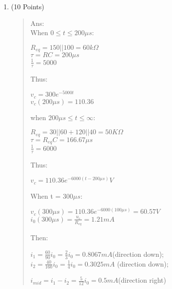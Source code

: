 \documentclass[12pt,a4paper]{article}
\begin{document}
\begin{enumerate}
		\item (10 Points)
		\begin{quote}
			Ans:\\
			When $0\leq t \leq 200\mu s$:
			\begin{center}
				$R_{eq}=150||100=60k\Omega$\\
				$\tau =RC=200\mu s$\\
				$\frac{1}{\tau} = 5000$
			\end{center}
			Thus:
			\begin{center}
				$v_c = 300e^{-5000t}$\\
				$v_c(200\mu s) = 110.36$
			\end{center}
		when $200\mu s \leq t \leq \infty$:
		\begin{center}
			$R_{eq} = 30||60+120||40=50K\Omega$\\
			$\tau = R_{eq}C = 166.67\mu s$\\
			$\frac{1}{\tau} = 6000$
		\end{center}
		Thus:
		\begin{center}
			$v_c = 110.36e^{-6000(t-200\mu s)}V$
		\end{center}
		When t = $300\mu s$:
		\begin{center}
			$v_c(300\mu s)=110.36e^{-6000(100\mu s)}=60.57V$\\
			$i_0(300\mu s)=\frac{u_c}{R_{eq}}=1.21mA$
		\end{center}
		Then:
		\begin{center}
			$i_1=\frac{60}{90}i_0=\frac{2}{3}i_0=0.8067mA$(direction down);
			\qquad $i_2=\frac{40}{160}i_0=\frac{1}{4}i_0 = 0.3025mA$ (direction down);
		\end{center}
	 	\begin{center}
	 		$i_{mid} = i_1-i_2= \frac{5}{12}i_0=0.5mA$(direction right)
	 	\end{center}
		\end{quote}
	

\end{enumerate}
\end{document}
